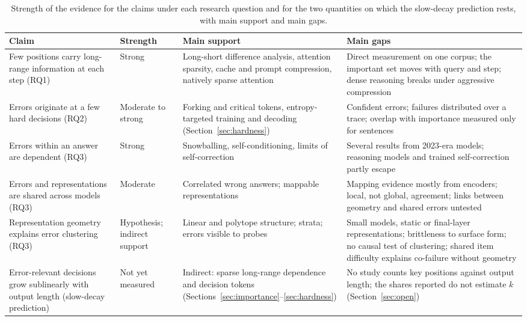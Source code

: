 \documentclass{ieeeaccess}
\newcommand{\rowgap}{\addlinespace[2.5pt]}
\begin{document}
\begin{table}[!t]
\caption{Strength of the evidence for the claims under each research question and for the two quantities on which the slow-decay prediction rests, with main support and main gaps.}
\label{tab:strengths}
\centering
\footnotesize
\begin{tabular}{@{}>{\raggedright\arraybackslash}p{2.8cm}>{\raggedright\arraybackslash}p{1.6cm}>{\raggedright\arraybackslash}p{5.6cm}>{\raggedright\arraybackslash}p{6.45cm}@{}}
\toprule
\textbf{Claim} & \textbf{Strength} & \textbf{Main support} & \textbf{Main gaps} \\
\midrule
Few positions carry long-range information at each step (RQ1) & Strong & Long-short difference analysis, attention sparsity, cache and prompt compression, natively sparse attention~\cite{fang2024what,tang2024quest,cai2025rkv,yuan2025nsa} & Direct measurement on one corpus; the important set moves with query and step; dense reasoning breaks under aggressive compression \\
\rowgap Errors originate at a few hard decisions (RQ2) & Moderate to strong & Forking and critical tokens, entropy-targeted training and decoding (Section~\ref{sec:hardness}) & Confident errors; failures distributed over a trace; overlap with importance measured only for sentences \\
\rowgap Errors within an answer are dependent (RQ3) & Strong & Snowballing, self-conditioning, limits of self-correction~\cite{zhang2024snowball,sinha2025illusion,huang2024cannot} & Several results from 2023-era models; reasoning models and trained self-correction partly escape \\
\rowgap Errors and representations are shared across models (RQ3) & Moderate & Correlated wrong answers; mappable representations~\cite{kim2025correlated,goel2025think,moschella2023relative,groger2026aristotelian} & Mapping evidence mostly from encoders; local, not global, agreement; links between geometry and shared errors untested \\
\rowgap Representation geometry explains error clustering (RQ3) & Hypothesis; indirect support & Linear and polytope structure; strata; errors visible to probes~\cite{marks2024geometry,park2025categorical,li2025unraveling,orgad2025know} & Small models, static or final-layer representations; brittleness to surface form; no causal test of clustering; shared item difficulty explains co-failure without geometry \\
\rowgap Error-relevant decisions grow sublinearly with output length (slow-decay prediction) & Not yet measured & Indirect: sparse long-range dependence and decision tokens (Sections~\ref{sec:importance}--\ref{sec:hardness}) & No study counts key positions against output length; the shares reported do not estimate $k$ (Section~\ref{sec:open}) \\

\end{tabular}
\end{table}
\end{document}
